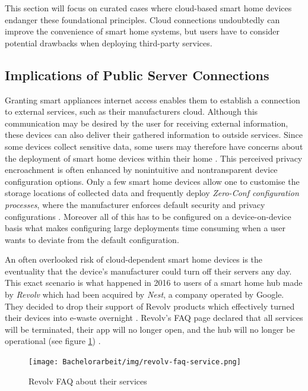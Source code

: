 
This section will focus on curated cases where cloud-based smart home devices endanger these foundational principles. Cloud connections undoubtedly can improve the convenience of smart home systems, but users have to consider potential drawbacks when deploying third-party services.

\subsection{Implications of Public Server Connections}
\label{sec:implications-server-connections}
Granting smart appliances internet access enables them to establish a connection to external services, such as their manufacturers cloud. Although this communication may be desired by the user for receiving external information, these devices can also deliver their gathered information to outside services. Since some devices collect sensitive data, some users may therefore have concerns about the deployment of smart home devices within their home \cite{ImprovingPrivacyControl-8514198}. This perceived privacy encroachment is often enhanced by nonintuitive and nontransparent device configuration options. Only a few smart home devices allow one to customise the storage locations of collected data and frequently deploy \textit{Zero-Conf configuration processes}, where the manufacturer enforces default security and privacy configurations \cite{ImprovingPrivacyControl-8514198}. Moreover all of this has to be configured on a device-on-device basis what makes configuring large deployments time consuming when a user wants to deviate from the default configuration.

An often overlooked risk of cloud-dependent smart home devices is the eventuality that the device's manufacturer could turn off their servers any day. This exact scenario is what happened in 2016 to users of a smart home hub made by \textit{Revolv} which had been acquired by \textit{Nest}, a company operated by Google. They decided to drop their support of Revolv products which effectively turned their devices into e-waste overnight \cite{Proctor2020BH}. Revolv's FAQ page declared that all services will be terminated, their app will no longer open, and the hub will no longer be operational (see figure \ref{fig:Revolv-FAQ-Services}) \cite{Gilbert2016Nest}.

\begin{figure}[H]
    \centering
    \texttt{[image: Bachelorarbeit/img/revolv-faq-service.png]}
    \caption{Revolv FAQ about their services \cite{Gilbert2016Nest}}
    \label{fig:Revolv-FAQ-Services}
\end{figure}

